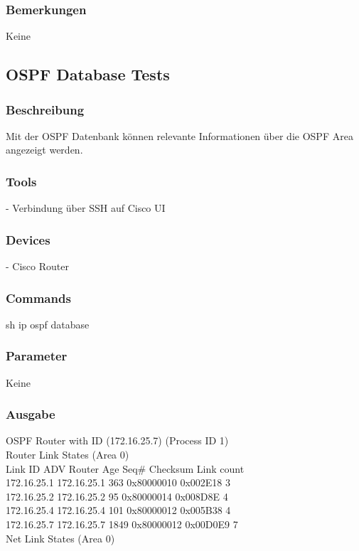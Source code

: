 \documentclass[a4,12pt]{scrartcl}
\begin{document}
\subsubsection{Bemerkungen}
Keine

\subsection{OSPF Database Tests}
\subsubsection{Beschreibung}
Mit der OSPF Datenbank können relevante Informationen über die OSPF Area angezeigt werden.
\subsubsection{Tools}
- Verbindung über SSH auf Cisco UI
\subsubsection{Devices}
- Cisco Router
\subsubsection{Commands}
sh ip ospf database
\subsubsection{Parameter}
Keine
\subsubsection{Ausgabe}
            OSPF Router with ID (172.16.25.7) (Process ID 1)\\

                Router Link States (Area 0)\\

\noindent Link ID         ADV Router      Age         Seq#       Checksum Link count\\
172.16.25.1     172.16.25.1     363         0x80000010 0x002E18 3\\
172.16.25.2     172.16.25.2     95          0x80000014 0x008D8E 4\\
172.16.25.4     172.16.25.4     101         0x80000012 0x005B38 4\\
172.16.25.7     172.16.25.7     1849        0x80000012 0x00D0E9 7\\

                Net Link States (Area 0)\\
\end{document}
